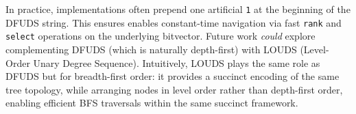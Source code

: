 In practice, implementations often prepend one artificial \texttt{1} at the beginning of the DFUDS string. This ensures enables constant-time navigation via fast \texttt{rank} and \texttt{select} operations on the underlying bitvector. Future work \emph{could} explore complementing DFUDS (which is naturally depth-first) with LOUDS (Level-Order Unary Degree Sequence). 
Intuitively, LOUDS plays the same role as DFUDS but for breadth-first order: it provides a succinct encoding of the same tree topology, while arranging nodes in level order rather than depth-first order, enabling efficient BFS traversals within the same succinct framework.
